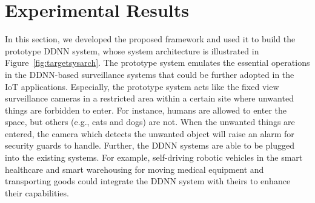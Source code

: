 \documentclass[conference]{IEEEtran}
\def\figurename{Figure}
\begin{document}

%
%
%
%

\section{Experimental Results}
\label{sec:results}
In this section, we developed the proposed framework and used it to build the prototype DDNN system, whose system architecture is illustrated in \figurename~\ref{fig:targetsysarch}. The prototype system emulates the essential operations in the DDNN-based surveillance systems that could be further adopted in the IoT applications. Especially, the prototype system acts like the fixed view surveillance cameras in a restricted area within a certain site where unwanted things are forbidden to enter. For instance, humans are allowed to enter the space, but others (e.g., cats and dogs) are not. When the unwanted things are entered, the camera which detects the unwanted object will raise an alarm for security guards to handle. Further, the DDNN systems are able to be plugged into the existing systems. For example, self-driving robotic vehicles in the smart healthcare and smart warehousing for moving medical equipment and transporting goods could integrate the DDNN system with theirs to enhance their capabilities.
\end{document}
